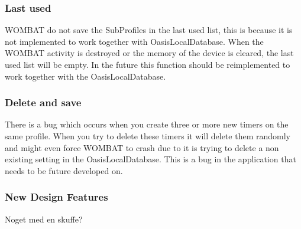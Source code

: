 \subsubsection{Last used}
WOMBAT do not save the SubProfiles in the last used list, this is because it is not implemented to work together with OasisLocalDatabase. When the WOMBAT activity is destroyed or the memory of the device is cleared, the last used list will be empty. In the future this function should be reimplemented to work together with the OasisLocalDatabase.

\subsubsection{Delete and save}
There is a bug which occurs when you create three or more new timers on the same profile. When you try to delete these timers it will delete them randomly and might even force WOMBAT to crash due to it is trying to delete a non existing setting in the OasisLocalDatabase. This is a bug in the application that needs to be future developed on.



\subsubsection{New Design Features}
Noget med en skuffe?